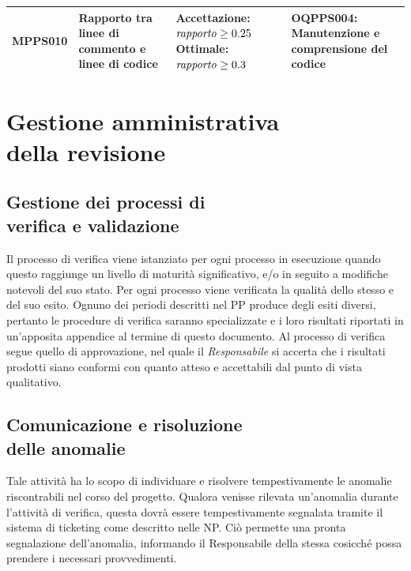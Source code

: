 \documentclass[openany,12pt,a4paper]{report}
\begin{document}
\begin{longtable}{| p{2cm} | p{3.5cm} |p{5.5cm} | p{5.5cm} |}
		\hline
		
		\newline MPPS010 &
		\newline Rapporto tra linee di commento e linee di codice &
		\newline \textbf{Accettazione:} \newline $ \textrm{\textit{rapporto}} \geq 0.25 $
		\newline \textbf{Ottimale:} $ \textrm{\textit{rapporto}} \geq 0.3 $ &
		\newline OQPPS004: Manutenzione e comprensione del codice 
		\\[1em]
		
		\hline
	\end{longtable}
	
\chapter{Gestione amministrativa \\ della revisione}
	
	\section{Gestione dei processi di \\ verifica e validazione}
	
	Il processo di verifica viene istanziato per ogni processo in esecuzione quando questo raggiunge un livello di maturità significativo, e/o in seguito a modifiche notevoli del suo stato. Per ogni processo viene verificata la qualità dello stesso e del suo esito. 
	Ognuno dei periodi descritti nel PP produce degli esiti diversi, pertanto le procedure di verifica saranno specializzate e i loro risultati riportati in un'apposita appendice al termine di questo documento. 
	Al processo di verifica segue quello di approvazione, nel quale il \textit{Responsabile} si accerta che i risultati prodotti siano conformi con quanto atteso e accettabili dal punto di vista qualitativo.
	
	\section{Comunicazione e risoluzione \\ delle anomalie}
	Tale attività ha lo scopo di individuare e risolvere tempestivamente le anomalie riscontrabili nel corso del progetto. Qualora venisse rilevata un'anomalia durante l'attività di verifica, questa dovrà essere tempestivamente segnalata tramite il sistema di ticketing come descritto nelle NP. Ciò permette una pronta segnalazione dell'anomalia, informando il Responsabile della stessa cosicché possa prendere i necessari provvedimenti.
\appendix
\end{document}
